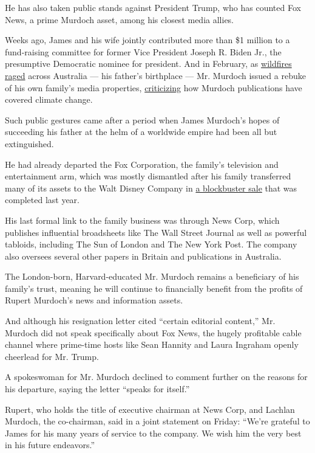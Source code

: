 He has also taken public stands against President Trump, who has counted
Fox News, a prime Murdoch asset, among his closest media allies.

Weeks ago, James and his wife jointly contributed more than \$1 million
to a fund-raising committee for former Vice President Joseph R. Biden
Jr., the presumptive Democratic nominee for president. And in February,
as
\href{https://www.nytimes.com/2020/01/21/world/australia/fires-size-climate.html}{wildfires
raged} across Australia --- his father's birthplace --- Mr. Murdoch
issued a rebuke of his own family's media properties,
\href{https://www.nytimes.com/2020/02/12/business/dealbook/james-murdoch-environment.html}{criticizing}
how Murdoch publications have covered climate change.

Such public gestures came after a period when James Murdoch's hopes of
succeeding his father at the helm of a worldwide empire had been all but
extinguished.

He had already departed the Fox Corporation, the family's television and
entertainment arm, which was mostly dismantled after his family
transferred many of its assets to the Walt Disney Company in
\href{https://www.nytimes.com/2018/07/27/business/media/disney-fox-merger-vote.html}{a
blockbuster sale} that was completed last year.

His last formal link to the family business was through News Corp, which
publishes influential broadsheets like The Wall Street Journal as well
as powerful tabloids, including The Sun of London and The New York Post.
The company also oversees several other papers in Britain and
publications in Australia.

The London-born, Harvard-educated Mr. Murdoch remains a beneficiary of
his family's trust, meaning he will continue to financially benefit from
the profits of Rupert Murdoch's news and information assets.

And although his resignation letter cited ``certain editorial content,''
Mr. Murdoch did not speak specifically about Fox News, the hugely
profitable cable channel where prime-time hosts like Sean Hannity and
Laura Ingraham openly cheerlead for Mr. Trump.

A spokeswoman for Mr. Murdoch declined to comment further on the reasons
for his departure, saying the letter ``speaks for itself.''

Rupert, who holds the title of executive chairman at News Corp, and
Lachlan Murdoch, the co-chairman, said in a joint statement on Friday:
``We're grateful to James for his many years of service to the company.
We wish him the very best in his future endeavors.''

